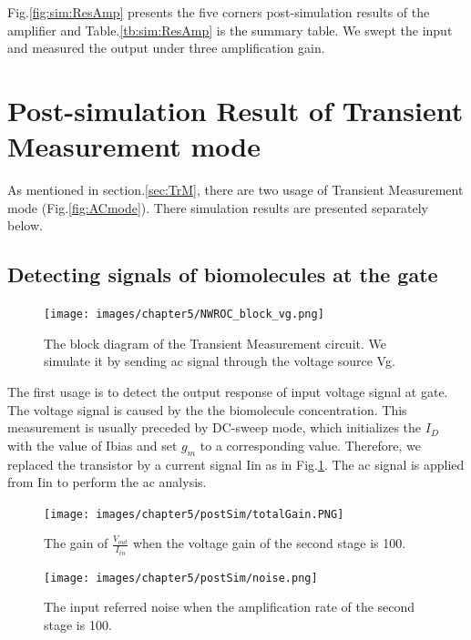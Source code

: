 {Fig.\ref{fig:sim:ResAmp} presents the five corners post-simulation results of the amplifier and Table.\ref{tb:sim:ResAmp} is the summary table.
We swept the input and measured the output under three amplification gain.







\section{Post-simulation Result of Transient Measurement mode}
As mentioned in section.\ref{sec:TrM}, there are two usage of Transient Measurement mode (Fig.\ref{fig:ACmode}).
There simulation results are presented separately below.

\subsection{Detecting signals of biomolecules at the gate}

\begin{figure}[!htbp]
    \centering
        \texttt{[image: images/chapter5/NWROC\_block\_vg.png]}
    \caption{The block diagram of the Transient Measurement circuit. We simulate it by sending ac signal through the voltage source Vg.}
    \label{fig:Nblockvg}
\end{figure}

The first usage is to detect the output response of input voltage signal at gate.
The voltage signal is caused by the the biomolecule concentration.
This measurement is usually preceded by DC-sweep mode, which initializes the $I_D$ with the value of Ibias and set $g_m$ to a corresponding value.
Therefore, we replaced the transistor by a current signal Iin as in Fig.\ref{fig:Nblockvg}.
The ac signal is applied from Iin to perform the ac analysis.

\begin{figure}[!htb]
    \centering
        \texttt{[image: images/chapter5/postSim/totalGain.PNG]}
    \caption{The gain of $\frac{V_{out}}{I_{in}}$ when the voltage gain of the second stage is 100.}
    \label{fig:sim:vgGain}
\end{figure}

\begin{figure}[!htb]
    \centering
        \texttt{[image: images/chapter5/postSim/noise.png]}
    \caption{The input referred noise when the amplification rate of the second stage is 100.}
    \label{fig:sim:vgnoise}
\end{figure}

}
